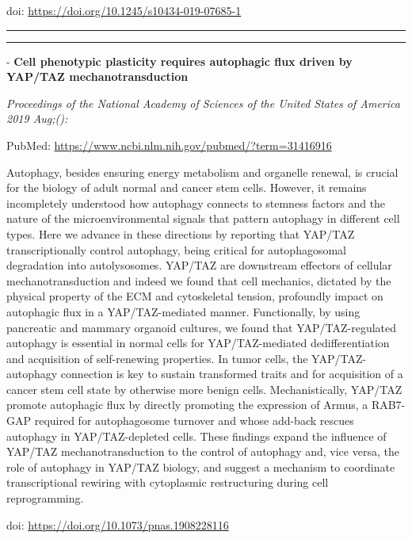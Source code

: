 \documentclass[]{article}
\begin{document}
doi: \url{https://doi.org/10.1245/s10434-019-07685-1}

{}

{}

\begin{center}\rule{0.5\linewidth}{\linethickness}\end{center}

\begin{center}\rule{0.5\linewidth}{\linethickness}\end{center}

 - \textbf{Cell phenotypic plasticity requires autophagic flux driven by
YAP/TAZ mechanotransduction}

\emph{Proceedings of the National Academy of Sciences of the United
States of America 2019 Aug;():}

PubMed: \url{https://www.ncbi.nlm.nih.gov/pubmed/?term=31416916}

Autophagy, besides ensuring energy metabolism and organelle renewal, is
crucial for the biology of adult normal and cancer stem cells. However,
it remains incompletely understood how autophagy connects to stemness
factors and the nature of the microenvironmental signals that pattern
autophagy in different cell types. Here we advance in these directions
by reporting that YAP/TAZ transcriptionally control autophagy, being
critical for autophagosomal degradation into autolysosomes. YAP/TAZ are
downstream effectors of cellular mechanotransduction and indeed we found
that cell mechanics, dictated by the physical property of the ECM and
cytoskeletal tension, profoundly impact on autophagic flux in a
YAP/TAZ-mediated manner. Functionally, by using pancreatic and mammary
organoid cultures, we found that YAP/TAZ-regulated autophagy is
essential in normal cells for YAP/TAZ-mediated dedifferentiation and
acquisition of self-renewing properties. In tumor cells, the
YAP/TAZ-autophagy connection is key to sustain transformed traits and
for acquisition of a cancer stem cell state by otherwise more benign
cells. Mechanistically, YAP/TAZ promote autophagic flux by directly
promoting the expression of Armus, a RAB7-GAP required for autophagosome
turnover and whose add-back rescues autophagy in YAP/TAZ-depleted cells.
These findings expand the influence of YAP/TAZ mechanotransduction to
the control of autophagy and, vice versa, the role of autophagy in
YAP/TAZ biology, and suggest a mechanism to coordinate transcriptional
rewiring with cytoplasmic restructuring during cell reprogramming.

doi: \url{https://doi.org/10.1073/pnas.1908228116}
\end{document}

